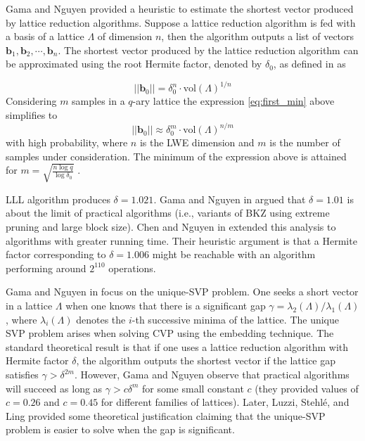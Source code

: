Gama and Nguyen \cite{gama2008predicting} provided a heuristic to estimate the shortest vector produced by lattice reduction algorithms.
Suppose a lattice reduction algorithm is fed with a basis of a lattice $\Lambda$ of dimension $n$, then the algorithm outputs a list of vectors $\pmb{b}_1,\pmb{b}_2,\cdots,\pmb{b}_n$.
The shortest vector produced by the lattice reduction algorithm can be approximated using the root Hermite factor, denoted by $\delta_0$, as defined in \cite{gama2008predicting} as

\begin{equation}
    ||\pmb{b}_0||=\delta^n_0 \cdot \text{vol}(\Lambda)^{1/n}
    \label{eq:first_min}
\end{equation}
Considering $m$ samples in a $q$-ary lattice the expression \ref{eq:first_min} above simplifies to
\begin{equation*}
    ||\pmb{b}_0|| \approx \delta^m_0 \cdot \text{vol}(\Lambda)^{n/m}
\end{equation*}
with high probability, where $n$ is the LWE dimension and $m$ is the number of samples under consideration.
The minimum of the expression above is attained for $m=\sqrt{\frac{n\log{q}}{\log \delta_0}}$ \cite{Micciancio2009}.

LLL algorithm produces $\delta = 1.021$.
Gama and Nguyen in \cite{gama2008predicting} argued that $\delta = 1.01$ is about the limit of practical algorithms (i.e., variants of BKZ using extreme pruning and large block size).
Chen and Nguyen in \cite{chen2011bkz} extended this analysis to algorithms with greater running time.
Their heuristic argument is that a Hermite factor corresponding to $\delta = 1.006$ might be reachable with an algorithm performing around $2^{110}$ operations.

Gama and Nguyen in \cite{gama2008predicting} focus on the unique-SVP problem.
One seeks a short vector in a lattice $\Lambda$ when one knows that there is a significant gap $\gamma = \lambda_2(\Lambda)/\lambda_1(\Lambda)$, where $\lambda_i(\Lambda)$ denotes the $i$-th successive minima of the lattice.
The unique SVP problem arises when solving CVP using the embedding technique.
The standard theoretical result is that if one uses a lattice reduction algorithm with Hermite factor $\delta$, the algorithm outputs the shortest vector if the lattice gap satisfies $\gamma > \delta^{2m}$.
However, Gama and Nguyen observe that practical algorithms will succeed as long as $\gamma > c\delta^m$ for some small constant $c$ (they provided values of $c = 0.26$ and $c = 0.45$ for different families of lattices).
Later, Luzzi, Stehl\'e, and Ling \cite{luzzi2013decoding} provided some theoretical justification claiming that the unique-SVP problem is easier to solve when the gap is significant.

